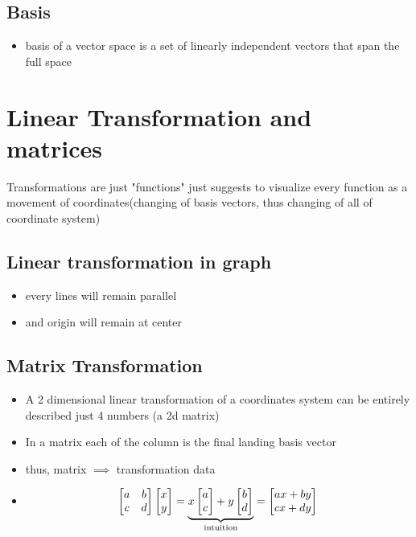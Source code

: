 \documentclass[a4paper]{article}
\begin{document}
\subsection{Basis}
\begin{itemize}
	\item basis of a vector space is a set of linearly independent vectors
	      that span the full space
\end{itemize}

\newpage
\section{Linear Transformation and matrices}
Transformations are just "functions" just suggests to visualize
every function as a movement of coordinates(changing of basis vectors,
thus changing of all of coordinate system)

\subsection{Linear transformation in graph}
\begin{itemize}
	\item every lines will remain parallel
	\item and origin will remain at center
\end{itemize}

\subsection{Matrix Transformation}
\begin{itemize}
	\item A 2 dimensional linear transformation of a coordinates
	      system can be entirely described just 4 numbers (a 2d matrix)
	\item  In a matrix each of the column is the final landing
	      basis vector
	\item thus, matrix $\implies$ transformation data
	\item \[
		      \begin{bmatrix} a & b \\
                c & d\end{bmatrix}
		      \begin{bmatrix} x \\ y
		      \end{bmatrix}
		      = \underbrace{x
			      \begin{bmatrix} a \\ c
			      \end{bmatrix}
			      + y \begin{bmatrix} b \\ d
			      \end{bmatrix}}
		      _{\text{intuition}}
		      = \begin{bmatrix} ax + by \\
			      cx + dy\end{bmatrix} \\
	      \]
\end{itemize}
\end{document}
